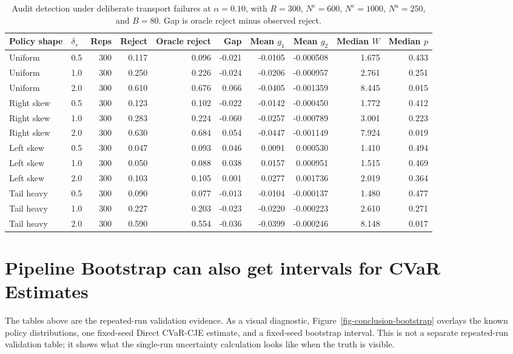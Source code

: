 \documentclass[11pt]{article}
\begin{document}
\begin{table}[H]
\centering
\scriptsize
\setlength{\tabcolsep}{3.0pt}
\begin{tabular}{@{}llrrrrrrrr@{}}
\toprule
Policy shape & \(\delta_s\) & Reps & Reject & Oracle reject & Gap & Mean \(g_1\) & Mean \(g_2\) & Median \(W\) & Median \(p\) \\
\midrule
Uniform & 0.5 & 300 & 0.117 & 0.096 & -0.021 & -0.0105 & -0.000508 & 1.675 & 0.433 \\
Uniform & 1.0 & 300 & 0.250 & 0.226 & -0.024 & -0.0206 & -0.000957 & 2.761 & 0.251 \\
Uniform & 2.0 & 300 & 0.610 & 0.676 & 0.066 & -0.0405 & -0.001359 & 8.445 & 0.015 \\
Right skew & 0.5 & 300 & 0.123 & 0.102 & -0.022 & -0.0142 & -0.000450 & 1.772 & 0.412 \\
Right skew & 1.0 & 300 & 0.283 & 0.224 & -0.060 & -0.0257 & -0.000789 & 3.001 & 0.223 \\
Right skew & 2.0 & 300 & 0.630 & 0.684 & 0.054 & -0.0447 & -0.001149 & 7.924 & 0.019 \\
Left skew & 0.5 & 300 & 0.047 & 0.093 & 0.046 & 0.0091 & 0.000530 & 1.410 & 0.494 \\
Left skew & 1.0 & 300 & 0.050 & 0.088 & 0.038 & 0.0157 & 0.000951 & 1.515 & 0.469 \\
Left skew & 2.0 & 300 & 0.103 & 0.105 & 0.001 & 0.0277 & 0.001736 & 2.019 & 0.364 \\
Tail heavy & 0.5 & 300 & 0.090 & 0.077 & -0.013 & -0.0104 & -0.000137 & 1.480 & 0.477 \\
Tail heavy & 1.0 & 300 & 0.227 & 0.203 & -0.023 & -0.0220 & -0.000223 & 2.610 & 0.271 \\
Tail heavy & 2.0 & 300 & 0.590 & 0.554 & -0.036 & -0.0399 & -0.000246 & 8.148 & 0.017 \\
\bottomrule
\end{tabular}
\caption{Audit detection under deliberate transport failures at \(\alpha=0.10\), with \(R=300\), \(N^c=600\), \(N^e=1000\), \(N^a=250\), and \(B=80\).  Gap is oracle reject minus observed reject.}
\label{tab-audit-failure}
\end{table}

\section{Pipeline Bootstrap can also get intervals for CVaR Estimates}

The tables above are the repeated-run validation evidence.  As a visual
diagnostic, Figure~\ref{fig-conclusion-bootstrap} overlays the known policy
distributions, one fixed-seed Direct CVaR-CJE estimate, and a fixed-seed
bootstrap interval.  This is not a separate repeated-run validation table; it
shows what the single-run uncertainty calculation looks like when the truth is
visible.
\end{document}
